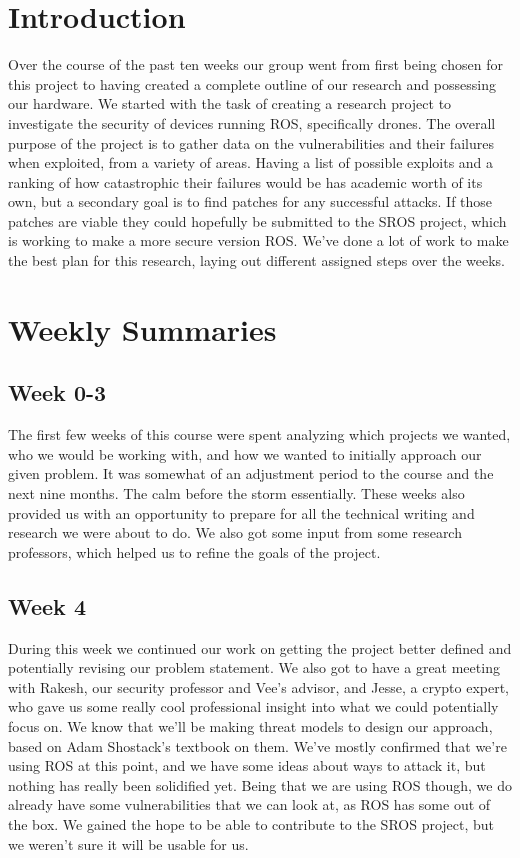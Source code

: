 \documentclass[IEEEtran,letterpaper,10pt,notitlepage,draftclsnofoot,onecolumn]{article}
\begin{document}
\newpage
{}
\tableofcontents
\clearpage

\section{Introduction}
Over the course of the past ten weeks our group went from first being chosen for this project to having created a complete outline of our research and possessing our hardware. 
We started with the task of creating a research project to investigate the security of devices running ROS, specifically drones.
The overall purpose of the project is to gather data on the vulnerabilities and their failures when exploited, from a variety of areas.
Having a list of possible exploits and a ranking of how catastrophic their failures would be has academic worth of its own, but a secondary goal is to find patches for any successful attacks.
If those patches are viable they could hopefully be submitted to the SROS project, which is working to make a more secure version ROS. 
We've done a lot of work to make the best plan for this research, laying out different assigned steps over the weeks.

\section{Weekly Summaries}
\subsection{Week 0-3}
The first few weeks of this course were spent analyzing which projects we wanted, who we would be working with, and how we wanted to initially approach our given problem. 
It was somewhat of an adjustment period to the course and the next nine months. The calm before the storm essentially. 
These weeks also provided us with an opportunity to prepare for all the technical writing and research we were about to do. 
We also got some input from some research professors, which helped us to refine the goals of the project.

\subsection{Week 4}
During this week we continued our work on getting the project better defined and potentially revising our problem statement. 
We also got to have a great meeting with Rakesh, our security professor and Vee's advisor, and Jesse, a crypto expert, who gave us some really cool professional insight into what we could potentially focus on. 
We know that we'll be making threat models to design our approach, based on Adam Shostack's textbook on them. \cite{TMDS} 
We've mostly confirmed that we're using ROS at this point, and we have some ideas about ways to attack it, but nothing has really been solidified yet. 
Being that we are using ROS though, we do already have some vulnerabilities that we can look at, as ROS has some out of the box. 
We gained the hope to be able to contribute to the SROS project, but we weren't sure it will be usable for us.
\end{document}
